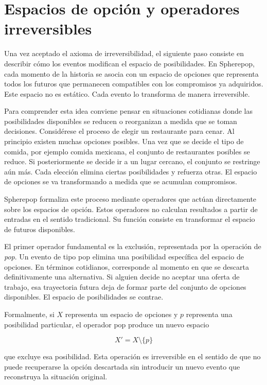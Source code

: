 \documentclass[12pt]{article}
\begin{document}
\section{Espacios de opción y operadores irreversibles}

Una vez aceptado el axioma de irreversibilidad, el siguiente paso consiste en describir cómo los eventos modifican el espacio de posibilidades. En Spherepop, cada momento de la historia se asocia con un espacio de opciones que representa todos los futuros que permanecen compatibles con los compromisos ya adquiridos. Este espacio no es estático. Cada evento lo transforma de manera irreversible.

Para comprender esta idea conviene pensar en situaciones cotidianas donde las posibilidades disponibles se reducen o reorganizan a medida que se toman decisiones. Considérese el proceso de elegir un restaurante para cenar. Al principio existen muchas opciones posibles. Una vez que se decide el tipo de comida, por ejemplo comida mexicana, el conjunto de restaurantes posibles se reduce. Si posteriormente se decide ir a un lugar cercano, el conjunto se restringe aún más. Cada elección elimina ciertas posibilidades y refuerza otras. El espacio de opciones se va transformando a medida que se acumulan compromisos.

Spherepop formaliza este proceso mediante operadores que actúan directamente sobre los espacios de opción. Estos operadores no calculan resultados a partir de entradas en el sentido tradicional. Su función consiste en transformar el espacio de futuros disponibles.

El primer operador fundamental es la exclusión, representada por la operación de \emph{pop}. Un evento de tipo pop elimina una posibilidad específica del espacio de opciones. En términos cotidianos, corresponde al momento en que se descarta definitivamente una alternativa. Si alguien decide no aceptar una oferta de trabajo, esa trayectoria futura deja de formar parte del conjunto de opciones disponibles. El espacio de posibilidades se contrae.

Formalmente, si \(X\) representa un espacio de opciones y \(p\) representa una posibilidad particular, el operador pop produce un nuevo espacio

\[
X' = X \setminus \{p\}
\]

que excluye esa posibilidad. Esta operación es irreversible en el sentido de que no puede recuperarse la opción descartada sin introducir un nuevo evento que reconstruya la situación original.
\end{document}
